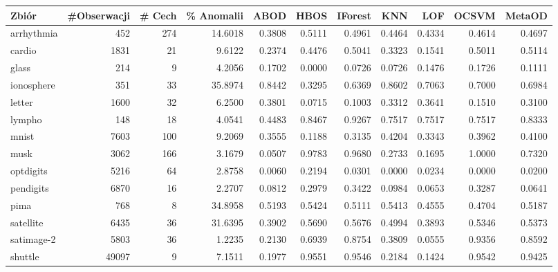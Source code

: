 \begin{sidewaystable}
    \centering
\begin{tabular}{lrrrrrrrrrr}
\toprule
       Zbiór &  \#Obserwacji &  \# Cech &  \% Anomalii &   ABOD &   HBOS &  IForest &    KNN &    LOF &  OCSVM &  MetaOD \\
\midrule
arrhythmia &       452 &           274 &       14.6018 & 0.3808 & 0.5111 &   0.4961 & 0.4464 & 0.4334 & 0.4614 &  0.4697 \\
    cardio &      1831 &            21 &        9.6122 & 0.2374 & 0.4476 &   0.5041 & 0.3323 & 0.1541 & 0.5011 &  0.5114 \\
     glass &       214 &             9 &        4.2056 & 0.1702 & 0.0000 &   0.0726 & 0.0726 & 0.1476 & 0.1726 &  0.1111 \\
ionosphere &       351 &            33 &       35.8974 & 0.8442 & 0.3295 &   0.6369 & 0.8602 & 0.7063 & 0.7000 &  0.6984 \\
    letter &      1600 &            32 &        6.2500 & 0.3801 & 0.0715 &   0.1003 & 0.3312 & 0.3641 & 0.1510 &  0.3100 \\
    lympho &       148 &            18 &        4.0541 & 0.4483 & 0.8467 &   0.9267 & 0.7517 & 0.7517 & 0.7517 &  0.8333 \\
     mnist &      7603 &           100 &        9.2069 & 0.3555 & 0.1188 &   0.3135 & 0.4204 & 0.3343 & 0.3962 &  0.4100 \\
      musk &      3062 &           166 &        3.1679 & 0.0507 & 0.9783 &   0.9680 & 0.2733 & 0.1695 & 1.0000 &  0.7320 \\
 optdigits &      5216 &            64 &        2.8758 & 0.0060 & 0.2194 &   0.0301 & 0.0000 & 0.0234 & 0.0000 &  0.0200 \\
 pendigits &      6870 &            16 &        2.2707 & 0.0812 & 0.2979 &   0.3422 & 0.0984 & 0.0653 & 0.3287 &  0.0641 \\
      pima &       768 &             8 &       34.8958 & 0.5193 & 0.5424 &   0.5111 & 0.5413 & 0.4555 & 0.4704 &  0.5187 \\
 satellite &      6435 &            36 &       31.6395 & 0.3902 & 0.5690 &   0.5676 & 0.4994 & 0.3893 & 0.5346 &  0.5373 \\
satimage-2 &      5803 &            36 &        1.2235 & 0.2130 & 0.6939 &   0.8754 & 0.3809 & 0.0555 & 0.9356 &  0.8592 \\
   shuttle &     49097 &             9 &        7.1511 & 0.1977 & 0.9551 &   0.9546 & 0.2184 & 0.1424 & 0.9542 &  0.9425 \\

\end{tabular}
\end{sidewaystable}
